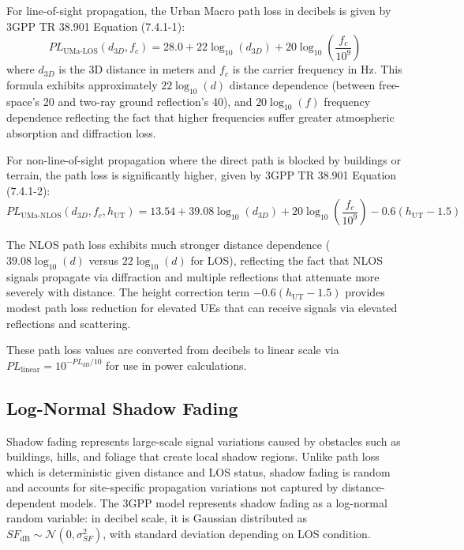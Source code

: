 For line-of-sight propagation, the Urban Macro path loss in decibels is given by 3GPP TR 38.901 Equation (7.4.1-1):
\begin{equation}
PL_{\text{UMa-LOS}}(d_{3D}, f_c) = 28.0 + 22 \log_{10}(d_{3D}) + 20 \log_{10}\left(\frac{f_c}{10^9}\right)
\end{equation}
where $d_{3D}$ is the 3D distance in meters and $f_c$ is the carrier frequency in Hz. This formula exhibits approximately $22 \log_{10}(d)$ distance dependence (between free-space's 20 and two-ray ground reflection's 40), and $20 \log_{10}(f)$ frequency dependence reflecting the fact that higher frequencies suffer greater atmospheric absorption and diffraction loss.

For non-line-of-sight propagation where the direct path is blocked by buildings or terrain, the path loss is significantly higher, given by 3GPP TR 38.901 Equation (7.4.1-2):
\begin{equation}
PL_{\text{UMa-NLOS}}(d_{3D}, f_c, h_{\text{UT}}) = 13.54 + 39.08 \log_{10}(d_{3D}) + 20 \log_{10}\left(\frac{f_c}{10^9}\right) - 0.6(h_{\text{UT}} - 1.5)
\end{equation}

The NLOS path loss exhibits much stronger distance dependence ($39.08 \log_{10}(d)$ versus $22 \log_{10}(d)$ for LOS), reflecting the fact that NLOS signals propagate via diffraction and multiple reflections that attenuate more severely with distance. The height correction term $-0.6(h_{\text{UT}} - 1.5)$ provides modest path loss reduction for elevated UEs that can receive signals via elevated reflections and scattering.

These path loss values are converted from decibels to linear scale via $PL_{\text{linear}} = 10^{-PL_{\text{dB}}/10}$ for use in power calculations.

\subsection{Log-Normal Shadow Fading}

Shadow fading represents large-scale signal variations caused by obstacles such as buildings, hills, and foliage that create local shadow regions. Unlike path loss which is deterministic given distance and LOS status, shadow fading is random and accounts for site-specific propagation variations not captured by distance-dependent models. The 3GPP model represents shadow fading as a log-normal random variable: in decibel scale, it is Gaussian distributed as $SF_{\text{dB}} \sim \mathcal{N}(0, \sigma_{SF}^2)$, with standard deviation depending on LOS condition.

